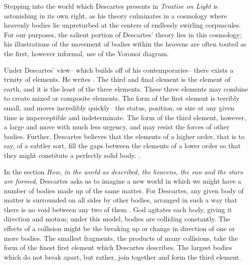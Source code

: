 \documentclass[12pt,twoside]{reedthesis}
\begin{document}
    Stepping into the world which Descartes presents in \emph{Treatise on Light} is astonishing in its own right, as his theory culminates in a cosmology where heavenly bodies lie unpreturbed at the centers of endlessly swirling corpuscules. For our purposes, the salient portion of Descartes' theory lies in this cosmology; his illustrations of the movement of bodies within the heavens are often touted as the first, however informal, use of the Voronoi diagram. \par

    Under Descartes' view-- which builds off of his contemporaries-- there exists a trinity of elements. He writes \citep[][p. 17]{descartes}. The third and final element is the element of earth, and it is the least  of the three elements. These three elements may combine to create mixed or composite elements. The form of the first element is terribly small, and moves incredibly quickly-- the status, position, or size at any given time is imperceptible and indeterminate. The form of the third element, however, a large and move with much less urgency, and may resist the forces of other bodies. Further, Descartes believes that the elements of a higher order, that is to say, of a subtler sort, fill the gaps between the elements of a lower order so that they might constitute a perfectly solid body.  \citep[][p. 17]{descartes}. \par 

    In the section \emph{How, in the world as described, the heavens, the sun and the stars are formed}, Descartes asks us to imagine a new world in which we might have a number of bodies made up of the same matter. For Descartes, any given body of matter is surrounded on all sides by other bodies, arranged in such a way that there is no void between any two of them \citep[][p. 25]{descartes}. God agitates each body, giving it direction and motion; under this model, bodies are colliding constantly. The effects of a collision might be the breaking up or change in direction of one or more bodies. The smallest fragments, the products of many collisions, take the form of the finest first element which Descartes describes. The largest bodies which do not break apart, but rather, join together and form the third element. \par
\end{document}
